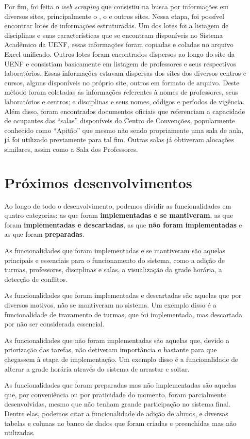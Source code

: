 Por fim, foi feita o \textit{web scraping} que consistiu na busca por informações em diversos sites, principalmente o , o  e outros sites. Nessa etapa, foi possível encontrar lotes de informações estruturadas. Um dos lotes foi a listagem de disciplinas e suas características que se encontram disponíveis no Sistema Acadêmico da UENF, essas informações foram copiadas e coladas no arquivo Excel unificado. Outros lotes foram encontrados dispersos ao longo do site da UENF e consistiam basicamente em listagem de professores e seus respectivos laboratórios. Essas informações estavam dispersas dos sites dos diversos centros e cursos, alguns disponíveis no próprio site, outros em formato de arquivo. Deste método foram coletadas as informações referentes à nomes de professores, seus laboratórios e centros; e disciplinas e seus nomes, códigos e períodos de vigência. Além disso, foram encontrados documentos oficiais que referenciam a capacidade de ocupantes das ``salas'' disponíveis do Centro de Convenções, popularmente conhecido como ``Apitão'' que mesmo não sendo propriamente uma sala de aula, já foi utilizado previamente para tal fim. Outras salas já obtiveram alocações similares, assim como a Sala dos Professores.

\section{Próximos desenvolvimentos} \label{sec:proximos}

Ao longo de todo o desenvolvimento, podemos dividir as funcionalidades em quatro categorias: as que foram \textbf{implementadas e se mantiveram}, as que foram \textbf{implementadas e descartadas}, as que \textbf{não foram implementadas} e as que foram \textbf{preparadas}.

As funcionalidades que foram implementadas e se mantiveram são aquelas principais e essenciais para o funcionamento do sistema, como a adição de turmas, professores, disciplinas e salas, a visualização da grade horária, a detecção de conflitos.

As funcionalidades que foram implementadas e descartadas são aquelas que por diversos motivos, não se mantiveram no sistema. Um exemplo disso é a funcionalidade de travamento de turmas, que foi implementada, mas descartada por não ser considerada essencial.

As funcionalidades que não foram implementadas são aquelas que, devido a priorização das tarefas, não detiveram importância o bastante para que chegassem à etapa de implementação. Um exemplo disso é a funcionalidade de alterar a grade horária através do sistema de arrastar e soltar.

As funcionalidades que foram preparadas mas não implementadas são aquelas que, por conveniência ou por praticidade do momento, foram parcialmente desenvolvidas, mesmo que não tenham grande participação no sistema final. Dentre elas, podemos citar a funcionalidade de adição de alunos, e diversas tabelas e colunas no banco de dados que foram criadas e preenchidas mas não utilizadas.